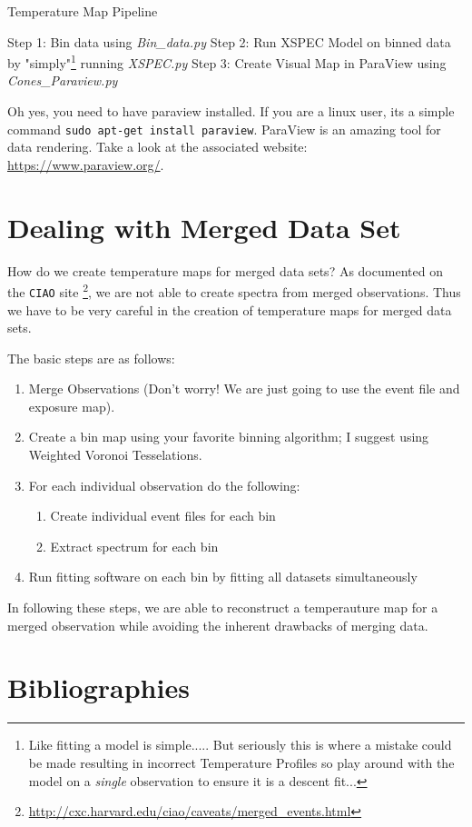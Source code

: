 \documentclass[11pt,letterpaper]{article}
\begin{document}
\begin{algorithm}[H]\label{algo:BA}
	\caption{Temperature Map Pipeline}
	Step 1: Bin data using \textit{Bin\_data.py} \;
	Step 2: Run XSPEC Model on binned data by "simply"\footnote{Like fitting a model is simple..... But seriously this is where a mistake could be made resulting in incorrect Temperature Profiles so play around with the model on a \textit{single} observation to ensure it is a descent fit...} running \textit{XSPEC.py} \;
	Step 3: Create Visual Map in ParaView using \textit{Cones\_Paraview.py} \;
\end{algorithm}

Oh yes, you need to have paraview installed. If you are a linux user, its a simple command \texttt{sudo apt-get install paraview}. ParaView is an amazing tool for data rendering. Take a look at the associated website: \href{https://www.paraview.org/}{https://www.paraview.org/}.


\newpage
\section{Dealing with Merged Data Set}
How do we create temperature maps for merged data sets? As documented on the \texttt{CIAO} site \footnote{\href{http://cxc.harvard.edu/ciao/caveats/merged_events.html}{http://cxc.harvard.edu/ciao/caveats/merged\_events.html}}, we are not able to create spectra from merged observations. Thus we have to be very careful in the creation of 
temperature maps for merged data sets. 

The basic steps are as follows:
\begin{enumerate}
	\item Merge Observations (Don't worry! We are just going to use the event file and exposure map).
	\item Create a bin map using your favorite binning algorithm; I suggest using Weighted Voronoi Tesselations.
	\item For each individual observation do the following:
	\begin{enumerate}
		\item Create individual event files for each bin
		\item Extract spectrum for each bin
	\end{enumerate}
	\item Run fitting software on each bin by fitting all datasets simultaneously
\end{enumerate}

In following these steps, we are able to reconstruct a temperauture map for a merged observation while avoiding the inherent drawbacks of merging data.

\newpage

\section*{Bibliographies}


\end{document}
